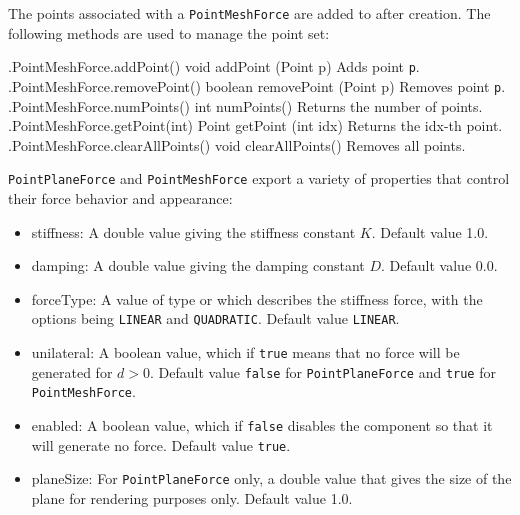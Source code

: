The points associated with a {\tt PointMeshForce} are added to after
creation. The following methods are used to manage the point set:
%
\begin{methodtable}{0.6}{0.4}
\midline
%
\methodentry
{\mech.PointMeshForce.addPoint()}%
{void addPoint (Point p)}%
{Adds point {\tt p}.}%
%
\methodentry
{\mech.PointMeshForce.removePoint()}%
{boolean removePoint (Point p)}%
{Removes point {\tt p}.}%
%
\methodentry
{\mech.PointMeshForce.numPoints()}%
{int numPoints()}%
{Returns the number of points.}%
%
\methodentry
{\mech.PointMeshForce.getPoint(int)}%
{Point getPoint (int idx)}%
{Returns the idx-th point.}%
%
\methodentry
{\mech.PointMeshForce.clearAllPoints()}%
{void clearAllPoints()}%
{Removes all points.}%
%
\midline
\end{methodtable}
%

{\tt PointPlaneForce} and {\tt PointMeshForce} export a variety of properties
that control their force behavior and appearance:

\begin{itemize}

\item {\sf stiffness}: A double value giving the stiffness constant $K$.
Default value 1.0.

\item {\sf damping}: A double value giving the damping constant $D$.
Default value 0.0.

\item {\sf forceType}: A value of type
 or
which describes the
stiffness force, with the options being {\tt LINEAR} and {\tt QUADRATIC}.
Default value {\tt LINEAR}.

\item {\sf unilateral}: A boolean value, which if {\tt true} means
that no force will be generated for $d > 0$.  Default value {\tt false} for
{\tt PointPlaneForce} and {\tt true} for {\tt PointMeshForce}.

\item {\sf enabled}: A boolean value, which if {\tt false} disables
the component so that it will generate no force. Default value {\tt true}.

\item {\sf planeSize}: For {\tt PointPlaneForce} only, a double value 
that gives the size of the plane for rendering purposes only.
Default value 1.0.

\end{itemize}

